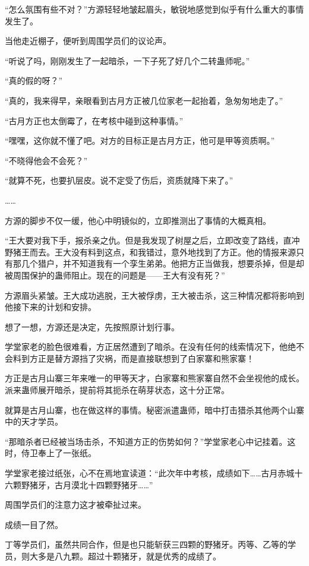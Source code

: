 \begin{this_body}
“怎么氛围有些不对？”方源轻轻地皱起眉头，敏锐地感觉到似乎有什么重大的事情发生了。

当他走近棚子，便听到周围学员们的议论声。

“听说了吗，刚刚发生了一起暗杀，一下子死了好几个二转蛊师呢。”

“真的假的呀？”

“真的，我来得早，亲眼看到古月方正被几位家老一起抬着，急匆匆地走了。”

“古月方正也太倒霉了，在考核中碰到这种事情。”

“嘿嘿，这你就不懂了吧。对方的目标正是古月方正，他可是甲等资质啊。”

“不晓得他会不会死？”

“就算不死，也要扒层皮。说不定受了伤后，资质就降下来了。”

……

方源的脚步不仅一缓，他心中明镜似的，立即推测出了事情的大概真相。

“王大要对我下手，报杀亲之仇。但是我发现了树屋之后，立即改变了路线，直冲野猪王而去。王大没有料到这点，和我错过，意外地找到了方正。他的情报来源只有那几个猎户，并不知道我有一个孪生弟弟。他把方正当做我，想要杀掉，但是却被周围保护的蛊师阻止。现在的问题是——王大有没有死？”

方源眉头紧皱。王大成功逃脱，王大被俘虏，王大被击杀，这三种情况都将影响到他接下来的计划和安排。

想了一想，方源还是决定，先按照原计划行事。

学堂家老的脸色很难看，方正居然遭到了暗杀。在没有任何的线索情况下，他绝不会料到方正是替方源挡了灾祸，而是直接联想到了白家寨和熊家寨！

方正是古月山寨三年来唯一的甲等天才，白家寨和熊家寨自然不会坐视他的成长。派来蛊师展开暗杀，提前将其扼杀在萌芽状态，这十分正常。

就算是古月山寨，也在做这样的事情。秘密派遣蛊师，暗中打击猎杀其他两个山寨中的天才学员。

“那暗杀者已经被当场击杀，不知道方正的伤势如何？”学堂家老心中记挂着。这时，侍卫奉上了一张纸。

学堂家老接过纸张，心不在焉地宣读道：“此次年中考核，成绩如下……古月赤城十六颗野猪牙，古月漠北十四颗野猪牙……”

周围学员们的注意力这才被牵扯过来。

成绩一目了然。

丁等学员们，虽然共同合作，但是也只能斩获三四颗的野猪牙。丙等、乙等的学员，则大多是八九颗。超过十颗猪牙，就是优秀的成绩了。


\end{this_body}
